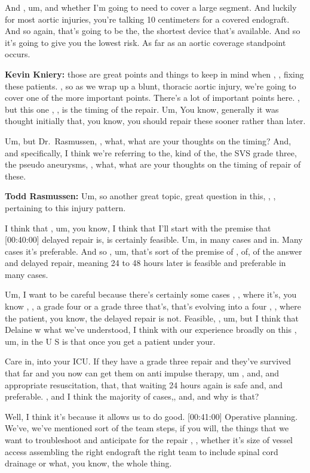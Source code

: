 \documentclass[
]{book}
\begin{document}
And , um, and whether I'm going to need to cover a large segment. And
luckily for most aortic injuries, you're talking 10 centimeters for a
covered endograft. And so again, that's going to be the, the shortest
device that's available. And so it's going to give you the lowest risk.
As far as an aortic coverage standpoint occurs.

\textbf{Kevin Kniery:} those are great points and things to keep in mind when
, , fixing these patients. , so as we wrap up a blunt, thoracic aortic
injury, we're going to cover one of the more important points. There's a
lot of important points here. , but this one , , is the timing of the
repair. Um, You know, generally it was thought initially that, you know,
you should repair these sooner rather than later.

Um, but Dr.~Rasmussen, , what, what are your thoughts on the timing?
And, and specifically, I think we're referring to the, kind of the, the
SVS grade three, the pseudo aneurysms, , what, what are your thoughts on
the timing of repair of these.

\textbf{Todd Rasmussen:} Um, so another great topic, great question in this,
, , pertaining to this injury pattern.

I think that , um, you know, I think that I'll start with the premise
that {[}00:40:00{]} delayed repair is, is certainly feasible. Um, in many
cases and in. Many cases it's preferable. And so , um, that's sort of
the premise of , of, of the answer and delayed repair, meaning 24 to 48
hours later is feasible and preferable in many cases.

Um, I want to be careful because there's certainly some cases , , where
it's, you know , , a grade four or a grade three that's, that's evolving
into a four , , where the patient, you know, the delayed repair is not.
Feasible, , um, but I think that Delaine w what we've understood, I
think with our experience broadly on this , um, in the U S is that once
you get a patient under your.

Care in, into your ICU. If they have a grade three repair and they've
survived that far and you now can get them on anti impulse therapy, um ,
and, and appropriate resuscitation, that, that waiting 24 hours again is
safe and, and preferable. , and I think the majority of cases,, and, and
why is that?

Well, I think it's because it allows us to do good. {[}00:41:00{]} Operative
planning. We've, we've mentioned sort of the team steps, if you will,
the things that we want to troubleshoot and anticipate for the repair ,
, whether it's size of vessel access assembling the right endograft the
right team to include spinal cord drainage or what, you know, the whole
thing.
\end{document}
